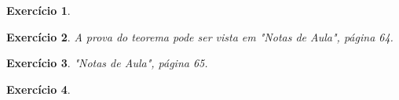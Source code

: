 \documentclass[letter,11pt]{article}
\newtheorem{exer}{Exercício}
\newcommand{\E}{\mathbb {E}}
\newcommand{\eqm}{\mbox{EQM}}
\newcommand{\V}{\mbox{Var}}
\begin{document}
\begin{exer} \rm 
% 
% 
% 
% 
\end{exer}
%
%
%
%
%
%
%
%
%
%

\begin{exer} \rm
A prova do teorema pode ser vista em "Notas de Aula", página 64.
\end{exer}



\begin{exer} \rm
"Notas de Aula", página 65.
\end{exer}
    
    
\begin{exer} \rm
\end{exer}
\end{document}
